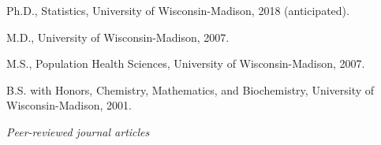 \documentclass[11pt,article,oneside]{memoir}
\begin{document}




\ind Ph.D., Statistics, University of Wisconsin-Madison, 2018 (anticipated).


\ind M.D., University of Wisconsin-Madison, 2007. 


\ind M.S., Population Health Sciences, University of Wisconsin-Madison, 2007.


\ind B.S. with Honors, Chemistry, Mathematics, and Biochemistry, University of Wisconsin-Madison, 2001.

\bigskip
 
\medskip
%
%
%
%

\noindent\emph{Peer-reviewed journal articles \vspace{0.05in}}
 
\end{document}
